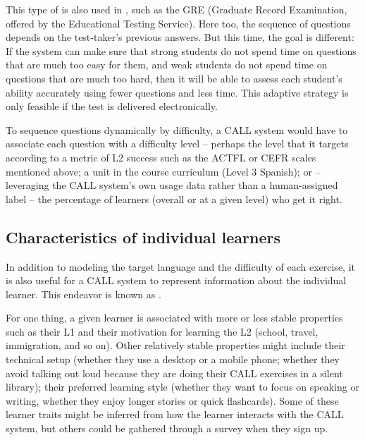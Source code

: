 This type of  is also used in , such as the GRE (Graduate Record Examination, offered by the Educational Testing Service).  Here too, the sequence of questions depends on the test-taker's previous answers. But this time, the goal is different: If the system can make
sure that strong students do not spend time on questions that are much
too easy for them, and weak students do not spend time on questions
that are much too hard, then it will be able to assess each student's ability accurately using fewer questions and less time.  This adaptive strategy is only feasible if the test is delivered electronically.

To sequence questions dynamically by difficulty, a CALL system would have to associate each question with a difficulty level -- perhaps the level that it targets according to a metric of L2 success such as the ACTFL or CEFR scales mentioned above; a unit in the course curriculum (Level 3 Spanish); or -- leveraging the CALL system's own usage data rather than a human-assigned label -- the percentage of learners (overall or at a given level) who get it right.






\subsection{Characteristics of individual learners}

In addition to modeling the target language and the difficulty of each exercise, it is also useful for a CALL system to represent information about the individual learner.  This endeavor is known as .

For one thing, a given learner is associated with more or less stable properties such as their L1 and their motivation for learning the L2 (school, travel, immigration, and so on).  Other relatively stable properties might include their technical setup (whether they use a desktop or a mobile phone; whether they avoid talking out loud because they are doing their CALL exercises in a silent library); their preferred learning style (whether they want to focus on speaking or writing, whether they enjoy longer stories or quick flashcards).  Some of these learner traits might be inferred from how the learner interacts with the CALL system, but others could be gathered through a survey when they sign up.

